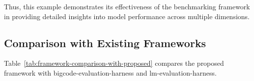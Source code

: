 Thus, this example demonstrates its effectiveness of the benchmarking framework in providing detailed insights into model performance across multiple dimensions.

\subsection{Comparison with Existing Frameworks}

Table~\ref{tab:framework-comparison-with-proposed} compares the proposed framework with bigcode-evaluation-harness and lm-evaluation-harness.

\begin{longtable}{|p{2.3cm}|p{4.3cm}|p{4.3cm}|p{4.3cm}|}



\end{longtable}
